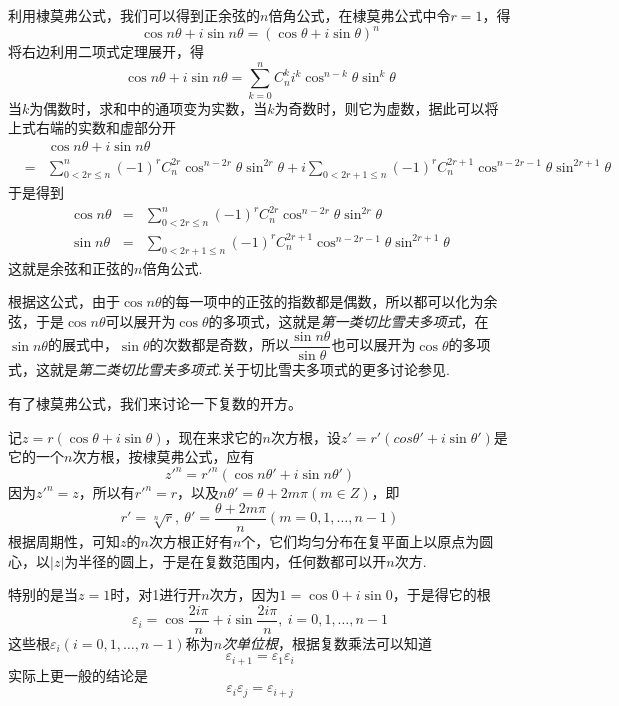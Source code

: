 \begin{example}
  利用棣莫弗公式，我们可以得到正余弦的$n$倍角公式，在棣莫弗公式中令$r=1$，得
  \[ \cos{n\theta}+i\sin{n\theta} = (\cos{\theta}+i\sin{\theta})^n \]
  将右边利用二项式定理展开，得
  \[ \cos{n\theta}+i\sin{n\theta} = \sum_{k=0}^n C_n^k i^k \cos^{n-k}{\theta}\sin^k{\theta} \]
  当$k$为偶数时，求和中的通项变为实数，当$k$为奇数时，则它为虚数，据此可以将上式右端的实数和虚部分开
  \begin{eqnarray*}
   && \cos{n\theta}+i\sin{n\theta}  \\
    & = & \sum_{0< 2r \leqslant n}^n (-1)^rC_n^{2r} \cos^{n-2r}{\theta}\sin^{2r}{\theta} + i\sum_{0<2r+1 \leqslant n}(-1)^rC_n^{2r+1} \cos^{n-2r-1}{\theta}\sin^{2r+1}{\theta} 
  \end{eqnarray*}
  于是得到
  \begin{eqnarray}
    \label{eq:cos-sin-of-n-theta}
    \cos{n\theta} & = & \sum_{0< 2r \leqslant n}^n (-1)^rC_n^{2r} \cos^{n-2r}{\theta}\sin^{2r}{\theta} \\
    \sin{n\theta} & = & \sum_{0<2r+1 \leqslant n}(-1)^rC_n^{2r+1} \cos^{n-2r-1}{\theta}\sin^{2r+1}{\theta}
  \end{eqnarray}
  这就是余弦和正弦的$n$倍角公式.

  根据这公式，由于$\cos{n\theta}$的每一项中的正弦的指数都是偶数，所以都可以化为余弦，于是$\cos{n\theta}$可以展开为$\cos{\theta}$的多项式，这就是\emph{第一类切比雪夫多项式}，在$\sin{n\theta}$的展式中，$\sin{\theta}$的次数都是奇数，所以$\dfrac{\sin{n\theta}}{\sin{\theta}}$也可以展开为$\cos{\theta}$的多项式，这就是\emph{第二类切比雪夫多项式}.关于切比雪夫多项式的更多讨论参见\cite{elementary-math-notes}.
\end{example}

有了棣莫弗公式，我们来讨论一下复数的开方。

记$z=r(\cos{\theta}+i\sin{\theta})$，现在来求它的$n$次方根，设$z'=r'(cos{\theta'+i\sin{\theta'}})$是它的一个$n$次方根，按棣莫弗公式，应有
\[ z'^n=r'^n(\cos{n\theta'}+i\sin{n\theta'}) \]
因为$z'^n=z$，所以有$r'^n=r$，以及$n\theta'=\theta+2m\pi(m \in Z)$，即
\[ r'=\sqrt[n]{r}, \  \theta'=\frac{\theta+2m\pi}{n}(m=0,1,\ldots,n-1) \]
根据周期性，可知$z$的$n$次方根正好有$n$个，它们均匀分布在复平面上以原点为圆心，以$|z|$为半径的圆上，于是在复数范围内，任何数都可以开$n$次方.

特别的是当$z=1$时，对1进行开$n$次方，因为$1=\cos{0}+i\sin{0}$，于是得它的根
\[ \varepsilon_i = \cos{\frac{2i\pi}{n}}+i\sin{\frac{2i\pi}{n}}, \  i=0,1,\ldots,n-1 \]
这些根$\varepsilon_i(i=0,1,\ldots,n-1)$称为\emph{$n$次单位根}，根据复数乘法可以知道
\[ \varepsilon_{i+1} = \varepsilon_1 \varepsilon_i \]
实际上更一般的结论是
\[ \varepsilon_i \varepsilon_j = \varepsilon_{i+j} \]


